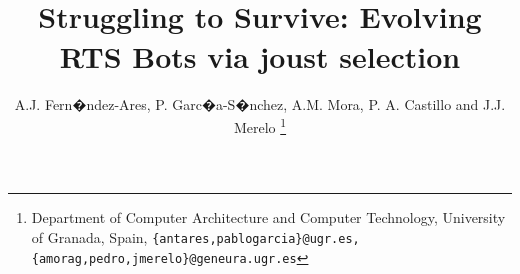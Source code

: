 \documentclass[conference]{IEEEtran}
\begin{document}


\title{\ \\ \LARGE\bf Struggling to Survive: Evolving RTS Bots via
  joust selection}





\author{A.J. Fern�ndez-Ares, P. Garc�a-S�nchez, A.M. Mora, P. A. Castillo and J.J. Merelo \thanks{Department of Computer Architecture and Computer Technology, University of Granada, Spain, {\tt \{antares,pablogarcia\}@ugr.es, \{amorag,pedro,jmerelo\}@geneura.ugr.es}}}

\maketitle
\end{document}
